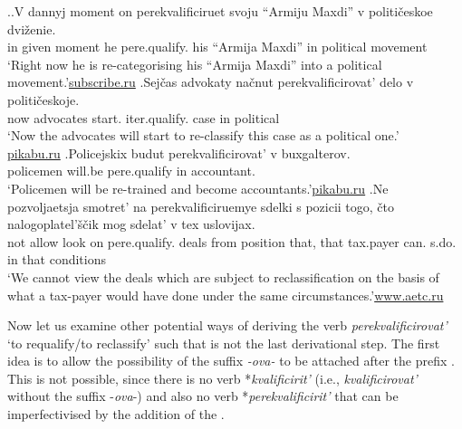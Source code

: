 \ex.\label{ex:qualify}\ag.\label{ex:qualify1}V dannyj moment on perekvalificiruet\textsuperscript{\IPF} svoju {``Armiju Maxdi''} v politi\v{c}eskoe dvi\v{z}enie.\\
in given moment he pere.qualify. his {``Armija Maxdi''} in political movement\\
\trans `Right now he is re-categorising his ``Armija Maxdi'' into a political movement.'\hbox{}\hfill\hbox{\url{subscribe.ru}}
\bg.\label{ex:qualify2}Sej\v{c}as advokaty na\v{c}nut perekvalificirovat'\textsuperscript{\IPF} delo v politi\v{c}eskoje.\\
now advocates start. iter.qualify. case in political\\
\trans `Now the advocates will start to re-classify this case as a political one.'\\\hbox{}\hfill\hbox{\url{pikabu.ru}}
\bg.\label{ex:qualify3}Policejskix budut perekvalificirovat'\textsuperscript{\IPF} v buxgalterov.\\	
policemen will.be pere.qualify in accountant.\\
\trans `Policemen will be re-trained and become accountants.'\hbox{}\hfill\hbox{\url{pikabu.ru}}
\bg.\label{ex:qualify4}Ne pozvoljaetsja smotret’ na perekvalificiruemye sdelki s pozicii togo, \v{c}to nalogoplatel’\v{s}\v{c}ik mog sdelat’ v tex uslovijax.\\
not allow look on pere.qualify. deals from position that, that tax.payer can. s.do. in that conditions\\
\trans `We cannot view the deals which are subject to reclassification on the basis of what a tax-payer would have done under the same circumstances.'\hbox{}\hfill\hbox{\url{www.aetc.ru}}

Now let us examine other potential ways of deriving the verb \textit{perekvalificirovat'} `to requalify/to reclassify' such that  is not the last derivational step. The first idea is to allow the possibility of the suffix \textit{-ova-} to be attached after the prefix . This is not possible, since there is no verb *\textit{kvalificirit'} (i.e., \textit{kvalificirovat'} without the suffix -\textit{ova}-) and also no verb  *\textit{perekvalificirit'} that can be imperfectivised by the addition of the .

